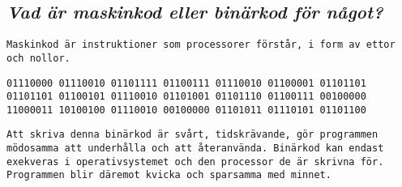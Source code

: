 \documentclass[../main.tex]{subfiles}
\begin{document}
\subsection{\textit{Vad är maskinkod eller binärkod för något?}}
\texttt{Maskinkod är instruktioner som processorer förstår, i form av ettor och nollor.}
\begin{lstlisting}
01110000 01110010 01101111 01100111 01110010 01100001 01101101
01101101 01100101 01110010 01101001 01101110 01100111 00100000
11000011 10100100 01110010 00100000 01101011 01110101 01101100
\end{lstlisting}
\texttt{Att skriva denna binärkod är svårt, tidskrävande, gör programmen mödosamma att underhålla och att återanvända. Binärkod kan endast exekveras i operativsystemet och den processor de är skrivna för.\\
Programmen blir däremot kvicka och sparsamma med minnet.}
\end{document}
